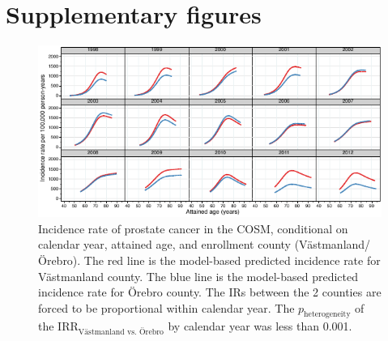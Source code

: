 %

\chapter{Supplementary figures}

\begin{figure}
\centering
\includegraphics[width=\linewidth]{figures/appendix_ir_cosm.pdf}
\caption[Incidence rate of prostate cancer in the COSM by calendar year, attained age, and enrollment county]{Incidence rate of prostate cancer in the COSM, conditional on calendar year, attained age, and enrollment county (Västmanland/Örebro). The red line is the model-based predicted incidence rate for Västmanland county. The blue line is the model-based predicted incidence rate for Örebro county. The IRs between the 2 counties are forced to be proportional within calendar year. The $p_{\textrm{heterogeneity}}$ of the $\mathrm{IRR}_{\textrm{Västmanland vs. Örebro}}$ by calendar year was less than 0.001.}
\label{fig:appendix_ir_cosm}
\end{figure}

